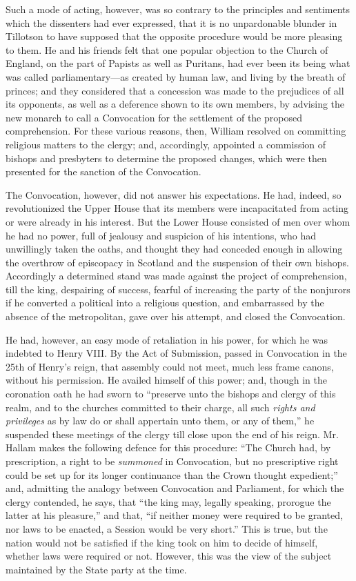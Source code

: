 Such a mode of acting,
however, was so contrary to the principles and sentiments which the
dissenters had ever expressed, that it is no unpardonable blunder in
Tillotson to have supposed that the opposite procedure would be more
pleasing to them. He and his friends felt that one popular objection
to the Church of England, on the part of Papists as well as Puritans,
had ever been its being what was called parliamentary—as created by
human law, and living by the breath of princes; and they considered
that a concession was made to the prejudices of all its opponents, as
well as a deference shown to its own members, by advising the new
monarch to call a Convocation for the settlement of the proposed
comprehension. For these various reasons, then, William resolved on
committing religious matters to the clergy; and, accordingly,
appointed a commission of bishops and presbyters to determine the
proposed changes, which were then presented for the sanction of the
Convocation.

The Convocation, however, did
not answer his expectations. He had, indeed, so revolutionized the
Upper House that its members were incapacitated from acting or were
already in his interest. But the Lower House consisted of men over
whom he had no power, full of jealousy and suspicion of his
intentions, who had unwillingly taken the oaths, and thought they had
conceded enough in allowing the overthrow of episcopacy in Scotland
and the suspension of their own bishops. Accordingly a determined
stand was made against the project of comprehension, till the king,
despairing of success, fearful of increasing the party of the
nonjurors if he converted a political into a religious question, and
embarrassed by the absence of the metropolitan, gave over his attempt,
and closed the Convocation.

He had, however, an easy mode
of retaliation in his power, for which he was indebted to Henry VIII.
By the Act of Submission, passed in Convocation in the 25th of Henry's
reign, that assembly could not meet, much less frame canons, without
his permission. He availed himself of this power; and, though in the
coronation oath he had sworn to ``preserve unto the bishops and clergy
of this realm, and to the churches committed to their charge, all such
\emph{rights and privileges} as by law do or shall appertain unto
them, or any of them,'' he suspended these meetings of the clergy till
close upon the end of his reign. Mr. Hallam makes the following
defence for this procedure: ``The Church had, by prescription, a right
to be \emph{summoned} in Convocation, but no prescriptive right could
be set up for its longer continuance than the Crown thought expedient;''
and, admitting the analogy between Convocation and Parliament, for
which the clergy contended, he says, that ``the king may, legally
speaking, prorogue the latter at his pleasure,'' and that, ``if neither
money were required to be granted, nor laws to be enacted, a Session
would be very short.'' This is true, but the nation would not be
satisfied if the king took on him to decide of himself, whether laws
were required or not. However, this was the view of the subject
maintained by the State party at the time.

